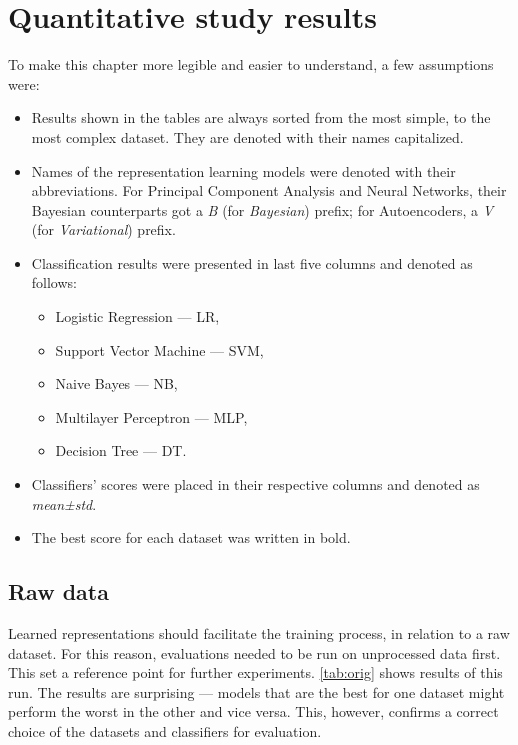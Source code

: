 \chapter{Quantitative study results}\label{chapter:quantitative}
\thispagestyle{chapterBeginStyle}
To make this chapter more legible and easier to understand, a few assumptions were:
\begin{itemize}
    \item Results shown in the tables are always sorted from the most simple, to the most complex dataset. They are denoted with their names capitalized.
    \item Names of the representation learning models were denoted with their abbreviations. For Principal Component Analysis and Neural Networks, their Bayesian counterparts got a \textit{B} (for \textit{Bayesian}) prefix; for Autoencoders, a \textit{V} (for \textit{Variational}) prefix.
    \item Classification results were presented in last five columns and denoted as follows:
    \begin{itemize}
        \item Logistic Regression — LR,
        \item Support Vector Machine — SVM,
        \item Naive Bayes — NB,
        \item Multilayer Perceptron — MLP,
        \item Decision Tree — DT.
    \end{itemize}
    \item Classifiers' scores were placed in their respective columns and denoted as \textit{mean±std}.
    \item The best score for each dataset was written in bold.
\end{itemize}

\section{Raw data}
Learned representations should facilitate the training process, in relation to a raw dataset. For this reason, evaluations needed to be run on unprocessed data first. This set a reference point for further experiments. \autoref{tab:orig} shows results of this run. The results are surprising — models that are the best for one dataset might perform the worst in the other and vice versa. This, however, confirms a correct choice of the datasets and classifiers for evaluation.

